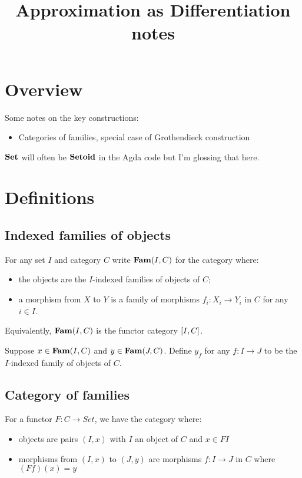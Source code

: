 \documentclass{acmart}
\begin{document}
\title{Approximation as Differentiation notes}
\maketitle

\section{Overview}

Some notes on the key constructions:
\begin{itemize}
\item Categories of families, special case of Grothendieck construction
\end{itemize}

\noindent $\mathbf{Set}$ will often be $\mathbf{Setoid}$ in the Agda code but I'm glossing that here.

\section{Definitions}

\subsection{Indexed families of objects}

For any set $I$ and category $C$ write $\mathbf{Fam}(I,C)$ for the category where:
\begin{itemize}
\item the objects are the $I$-indexed families of objects of $C$;
\item a morphism from $X$ to $Y$ is a family of morphisms $f_i: X_i \to Y_i$ in $C$ for any $i \in I$.
\end{itemize}

\noindent Equivalently, $\mathbf{Fam}(I,C)$ is the functor category $[I,C]$.

\noindent Suppose $x \in \mathbf{Fam}(I,C)$ and $y \in \mathbf{Fam}(J,C)$. Define $y_f$ for any $f: I \to J$ to be the
$I$-indexed family of objects of $C$.

\subsection{Category of families}

For a functor $F: C \to Set$, we have the category where:
\begin{itemize}
\item objects are pairs $(I, x)$ with $I$ an object of $C$ and $x \in FI$
\item morphisms from $(I, x)$ to $(J, y)$ are morphisms $f: I \to J$ in $C$ where $(Ff)(x) = y$
\end{itemize}
\end{document}
